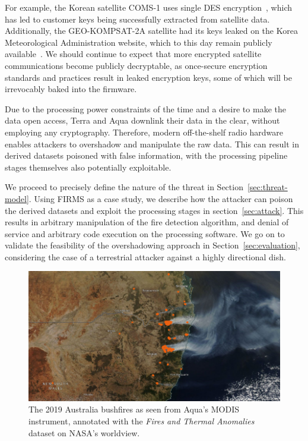 For example, the Korean satellite COMS-1 uses single DES encryption~\cite{lrit-key-dec}, which has led to customer keys being successfully extracted from satellite data.
Additionally, the GEO-KOMPSAT-2A satellite had its keys leaked on the Korea Meteorological Administration website, which to this day remain publicly available~\cite{xrit-rx}.
We should continue to expect that more encrypted satellite communications become publicly decryptable, as once-secure encryption standards and practices result in leaked encryption keys, some of which will be irrevocably baked into the firmware.

Due to the processing power constraints of the time and a desire to make the data open access, Terra and Aqua downlink their data in the clear, without employing any cryptography.
Therefore, modern off-the-shelf radio hardware enables attackers to overshadow and manipulate the raw data.
This can result in derived datasets poisoned with false information, with the processing pipeline stages themselves also potentially exploitable.

We proceed to precisely define the nature of the threat in Section~\ref{sec:threat-model}.
Using FIRMS as a case study, we describe how the attacker can poison the derived datasets and exploit the processing stages in section~\ref{sec:attack}.
This results in arbitrary manipulation of the fire detection algorithm, and denial of service and arbitrary code execution on the processing software.
We go on to validate the feasibility of the overshadowing approach in Section~\ref{sec:evaluation}, considering the case of a terrestrial attacker against a highly directional dish.

\begin{figure}
    \centering
    \includegraphics[width=\columnwidth]{diagrams/bushfire.png}
    \caption{The 2019 Australia bushfires as seen from Aqua's MODIS instrument, annotated with the \textit{Fires and Thermal Anomalies} dataset on NASA's worldview.\protect\footnotemark}
    \label{fig:bushfire}
\end{figure}

